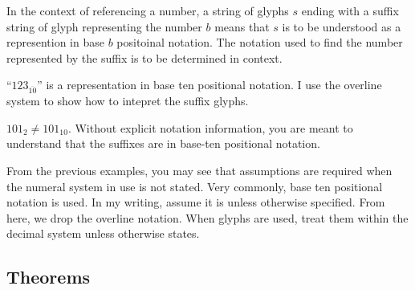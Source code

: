 \documentclass{article}
\begin{document}
	\begin{definition}
		In the context of referencing a number, a string of glyphs $s$ ending with a suffix string of glyph representing the number $b$ means that $s$ is to be understood as a represention in base $b$ positoinal notation. The notation used to find the number represented by the suffix is to be determined in context.
	\end{definition}
	\begin{example}
		``$123_{\overline{10}}$'' is a representation in base ten positional notation. I use the overline system to show how to intepret the suffix glyphs.
	\end{example}
	\begin{example}
		$101_2\neq 101_{10}$. Without explicit notation information, you are meant to understand that the suffixes are in base-ten positional notation. 
	\end{example}
	
		
	From the previous examples, you may see that assumptions are required when the numeral system in use is not stated. Very commonly, base ten positional notation is used. In my writing, assume it is unless otherwise specified. From here, we drop the overline notation. When glyphs are used, treat them within the decimal system unless otherwise states.
	
	\subsection{Theorems}
	
	
\end{document}
